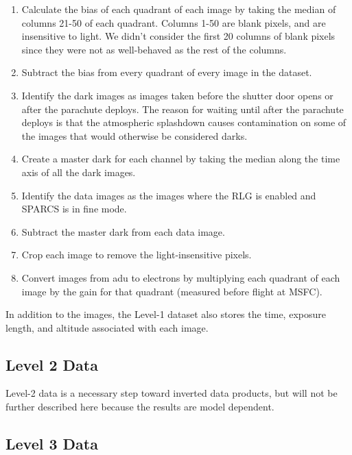 {    	\begin{enumerate}
    	    \item Calculate the bias of each quadrant of each image by taking the median of 
    	    columns 21-50 of each quadrant. Columns 1-50 are blank pixels, and are insensitive to light. We didn't consider the first 20 columns of blank pixels since they were not as well-behaved as the rest of the columns.
    	    \item Subtract the bias from every quadrant of every image in the dataset.
    	    \item Identify the dark images as images taken before the shutter door opens or after the parachute deploys.
    	    The reason for waiting until after the parachute deploys is that the atmospheric splashdown causes contamination on some of the images that would otherwise be considered darks.
    	    \item Create a master dark for each channel by taking the median along the time axis of all the dark images.
    	    \item Identify the data images as the images where the RLG is enabled and SPARCS is in fine mode.
    	    \item Subtract the master dark from each data image.
    	    \item Crop each image to remove the light-insensitive pixels.
    	    \item Convert images from adu to electrons by multiplying each quadrant of each image by the gain for that quadrant (measured before flight at MSFC).
    	\end{enumerate}
    	
	In addition to the images, the Level-1 dataset also stores the time, exposure length, and altitude associated with each image.

	\subsection{Level 2 Data}
	Level-2 data is a necessary step toward inverted data products,  but will not be further described here because the results are model dependent. 

    \subsection{Level 3 Data}
 
}
